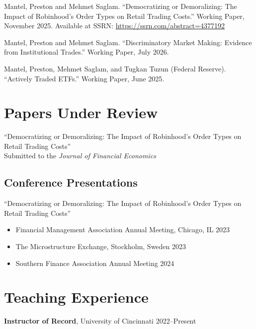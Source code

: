 \documentclass[11pt]{article}
\begin{document}
\vspace{6pt}
\noindent Mantel, Preston and Mehmet Saglam. ``Democratizing or Demoralizing: The Impact of Robinhood's Order Types on Retail Trading Costs.'' Working Paper, November 2025. Available at SSRN: \url{https://ssrn.com/abstract=4377192}

\vspace{6pt}
\noindent Mantel, Preston and Mehmet Saglam. ``Discriminatory Market Making: Evidence from Institutional Trades.'' Working Paper, July 2026.

\vspace{6pt}
\noindent Mantel, Preston, Mehmet Saglam, and Tugkan Tuzun (Federal Reserve). ``Actively Traded ETFs.'' Working Paper, June 2025.

\section*{Papers Under Review}

\noindent ``Democratizing or Demoralizing: The Impact of Robinhood's Order Types on Retail Trading Costs'' \\
\indent Submitted to the \textit{Journal of Financial Economics}

\begin{samepage}
\section*{Conference Presentations}

\noindent ``Democratizing or Demoralizing: The Impact of Robinhood's Order Types on Retail Trading Costs''
\begin{itemize}[nosep, topsep=2pt, leftmargin=1.5em]
  \item Financial Management Association Annual Meeting, Chicago, IL \hfill 2023
  \item The Microstructure Exchange, Stockholm, Sweden \hfill 2023
  \item Southern Finance Association Annual Meeting \hfill 2024
\end{itemize}
\end{samepage}

\newpage
\section*{Teaching Experience}

\noindent\textbf{Instructor of Record}, University of Cincinnati \hfill 2022--Present
\end{document}
